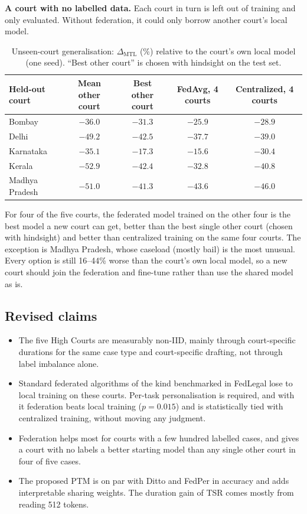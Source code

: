 \textbf{A court with no labelled data.} Each court in turn is left out of training and only evaluated.
Without federation, it could only borrow another court's local model.

\begin{table}[h]\centering\small
\begin{tabular}{@{}lcccc@{}}\toprule
Held-out court & Mean other court & Best other court & FedAvg, 4 courts & Centralized, 4 courts \\ \midrule
Bombay & $-36.0$ & $-31.3$ & $\mathbf{-25.9}$ & $-28.9$ \\
Delhi & $-49.2$ & $-42.5$ & $\mathbf{-37.7}$ & $-39.0$ \\
Karnataka & $-35.1$ & $-17.3$ & $\mathbf{-15.6}$ & $-30.4$ \\
Kerala & $-52.9$ & $-42.4$ & $\mathbf{-32.8}$ & $-40.8$ \\
Madhya Pradesh & $-51.0$ & $\mathbf{-41.3}$ & $-43.6$ & $-46.0$ \\ \bottomrule
\end{tabular}
\caption{Unseen-court generalisation: $\Delta_{\text{MTL}}$ (\%) relative to the court's own local model
(one seed). ``Best other court'' is chosen with hindsight on the test set.}
\label{tab:unseen}
\end{table}

For four of the five courts, the federated model trained on the other four is the best model a new
court can get, better than the best single other court (chosen with hindsight) and better than
centralized training on the same four courts. The exception is Madhya Pradesh, whose caseload (mostly
bail) is the most unusual. Every option is still 16--44\% worse than the court's own local model, so a
new court should join the federation and fine-tune rather than use the shared model as is.

\subsection*{Revised claims}
\begin{itemize}
  \item The five High Courts are measurably non-IID, mainly through court-specific durations for the
        same case type and court-specific drafting, not through label imbalance alone.
  \item Standard federated algorithms of the kind benchmarked in FedLegal lose to local training on
        these courts. Per-task personalisation is required, and with it federation beats local training
        ($p=0.015$) and is statistically tied with centralized training, without moving any judgment.
  \item Federation helps most for courts with a few hundred labelled cases, and gives a court with
        no labels a better starting model than any single other court in four of five cases.
  \item The proposed PTM is on par with Ditto and FedPer in accuracy and adds interpretable sharing
        weights. The duration gain of TSR comes mostly from reading 512 tokens.
\end{itemize}
